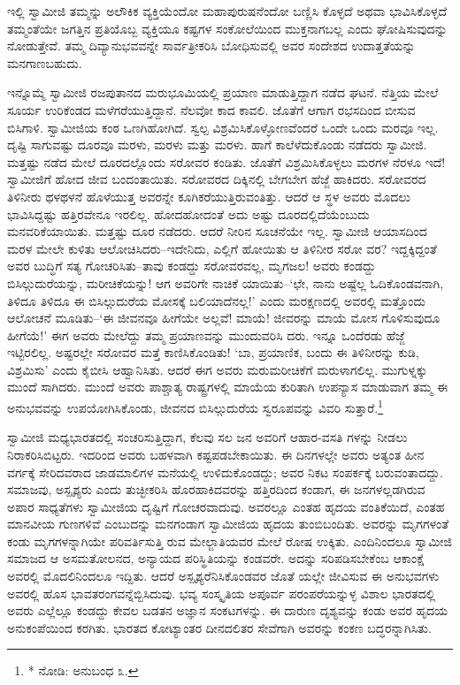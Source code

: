 ಇಲ್ಲಿ ಸ್ವಾಮೀಜಿ ತಮ್ಮನ್ನು ಅಲೌಕಿಕ ವ್ಯಕ್ತಿಯೆಂದೋ ಮಹಾಪುರುಷನೆಂದೋ ಬಣ್ಣಿಸಿ ಕೊಳ್ಳದೆ ಅಥವಾ ಭಾವಿಸಿಕೊಳ್ಳದೆ ತಮ್ಮಂತೆಯೇ ಜಗತ್ತಿನ ಪ್ರತಿಯೊಬ್ಬ ವ್ಯಕ್ತಿಯೂ ಕಷ್ಟಗಳ ಸಂಕೋಲೆಯಿಂದ ಮುಕ್ತನಾಗಬಲ್ಲ ಎಂದು ಘೋಷಿಸುವುದನ್ನು ನೋಡುತ್ತೇವೆ. ತಮ್ಮ ದಿವ್ಯಾನುಭವವನ್ನೇ ಸಾರ್ವತ್ರೀಕರಿಸಿ ಬೋಧಿಸುವಲ್ಲಿ ಅವರ ಸಂದೇಶದ ಉದಾತ್ತತೆಯನ್ನು ಮನಗಾಣಬಹುದು.

ಇನ್ನೊಮ್ಮೆ ಸ್ವಾಮೀಜಿ ರಜಪುತಾನದ ಮರುಭೂಮಿಯಲ್ಲಿ ಪ್ರಯಾಣ ಮಾಡುತ್ತಿದ್ದಾಗ ನಡೆದ ಘಟನೆ. ನೆತ್ತಿಯ ಮೇಲೆ ಸೂರ್ಯ ಉರಿಕೆಂಡದ ಮಳೆಗರೆಯುತ್ತಿದ್ದಾನೆ. ನೆಲವೋ ಕಾದ ಕಾವಲಿ. ಜೊತೆಗೆ ಆಗಾಗ ರಭಸದಿಂದ ಬೀಸುವ ಬಿಸಿಗಾಳಿ. ಸ್ವಾಮೀಜಿಯ ಕಂಠ ಒಣಗಿಹೋಗಿದೆ. ಸ್ವಲ್ಪ ವಿಶ್ರಮಿಸಿಕೊಳ್ಳೋಣವೆಂದರೆ ಒಂದೇ ಒಂದು ಮರವೂ ಇಲ್ಲ. ದೃಷ್ಟಿ ಸಾಗುವಷ್ಟು ದೂರವೂ ಮರಳು, ಮರಳು ಮತ್ತು ಮರಳು. ಹಾಗೆ ಕಾಲೆಳೆದುಕೊಂಡು ನಡೆದರು ಸ್ವಾಮೀಜಿ. ಮತ್ತಷ್ಟು ನಡೆದ ಮೇಲೆ ದೂರದಲ್ಲೊಂದು ಸರೋವರ ಕಂಡಿತು. ಜೊತೆಗೆ ವಿಶ್ರಮಿಸಿಕೊಳ್ಳಲು ಮರಗಳ ನೆರಳೂ ಇದೆ! ಸ್ವಾಮೀಜಿಗೆ ಹೋದ ಜೀವ ಬಂದಂತಾಯಿತು. ಸರೋವರದ ದಿಕ್ಕಿನಲ್ಲಿ ಬೇಗಬೇಗ ಹೆಜ್ಜೆ ಹಾಕಿದರು. ಸರೋವರದ ತಿಳಿನೀರು ಥಳಥಳನೆ ಹೊಳೆಯುತ್ತ ಅವರನ್ನೇ ಕೂಗಿಕರೆಯುತ್ತಿರುವಂತಿತ್ತು. ಆದರೆ ಆ ಸ್ಥಳ ಅವರು ಮೊದಲು ಭಾವಿಸಿದ್ದಷ್ಟು ಹತ್ತಿರವೇನೂ ಇರಲಿಲ್ಲ. ಹೋದಹೋದಂತೆ ಅದು ಅಷ್ಟು ದೂರದಲ್ಲಿದೆಯೆಂಬುದು ಮನವರಿಕೆಯಾಯಿತು. ಮತ್ತಷ್ಟು ದೂರ ನಡೆದರು. ಆದರೆ ನೀರಿನ ಸೂಚನೆಯೇ ಇಲ್ಲ. ಸ್ವಾಮೀಜಿ ಆಯಾಸದಿಂದ ಮರಳ ಮೇಲೇ ಕುಳಿತು ಆಲೋಚಿಸಿದರು–ಇದೇನಿದು, ಎಲ್ಲಿಗೆ ಹೋಯಿತು ಆ ತಿಳಿನೀರ ಸರೋ ವರ? ಇದ್ದಕ್ಕಿದ್ದಂತೆ ಅವರ ಬುದ್ಧಿಗೆ ಸತ್ಯ ಗೋಚರಿಸಿತು–ತಾವು ಕಂಡದ್ದು ಸರೋವರವಲ್ಲ, ಮೃಗಜಲ! ಅವರು ಕಂಡದ್ದು ಬಿಸಿಲ್ಗುದುರೆಯನ್ನು, ಮರೀಚಿಕೆಯನ್ನು! ಆಗ ಅವರಿಗೇ ನಾಚಿಕೆ ಯಾಯಿತು–‘ಛೇ, ನಾನು ಅಷ್ಟೆಲ್ಲ ಓದಿಕೊಂಡವನಾಗಿ, ತಿಳಿದೂ ತಿಳಿದೂ ಈ ಬಿಸಿಲ್ಗುದುರೆಯ ಮೋಸಕ್ಕೆ ಬಲಿಯಾದೆನಲ್ಲ!’ ಎಂದು ಮರಕ್ಷಣದಲ್ಲಿ ಅವರಲ್ಲಿ ಮತ್ತೊಂದು ಆಲೋಚನೆ ಮೂಡಿತು–‘ಈ ಜೀವನವೂ ಹೀಗೆಯೇ ಅಲ್ಲವೆ! ಮಾಯೆ! ಜೀವರನ್ನು ಮಾಯೆ ಮೋಸ ಗೊಳಿಸುವುದೂ ಹೀಗೆಯೆ!’ ಈಗ ಅವರು ಮೇಲೆದ್ದು ತಮ್ಮ ಪ್ರಯಾಣವನ್ನು ಮುಂದುವರಿಸಿ ದರು. ಇನ್ನೂ ಒಂದೆರಡು ಹೆಜ್ಜೆ ಇಟ್ಟಿರಲಿಲ್ಲ. ಅಷ್ಟರಲ್ಲೇ ಸರೋವರ ಮತ್ತೆ ಕಾಣಿಸಿಕೊಂಡಿತು! ‘ಬಾ, ಪ್ರಯಾಣಿಕ, ಬಂದು ಈ ತಿಳಿನೀರನ್ನು ಕುಡಿ, ವಿಶ್ರಮಿಸು’ ಎಂದು ಕೈಬೀಸಿ ಆಹ್ವಾನಿಸಿತು. ಆದರೆ ಈಗ ಅವರು ಮರುಮರೀಚಿಕೆಗೆ ಮರುಳಾಗಲಿಲ್ಲ. ಮುಗುಳ್ನಕ್ಕು ಮುಂದೆ ಸಾಗಿದರು. ಮುಂದೆ ಅವರು ಪಾಶ್ಚಾತ್ಯ ರಾಷ್ಟ್ರಗಳಲ್ಲಿ ಮಾಯೆಯ ಕುರಿತಾಗಿ ಉಪನ್ಯಾಸ ಮಾಡುವಾಗ ತಮ್ಮ ಈ ಅನುಭವವನ್ನು ಉಪಯೋಗಿಸಿಕೊಂಡು, ಜೀವನದ ಬಿಸಿಲ್ಗುದುರೆಯ ಸ್ವರೂಪವನ್ನು ವಿವರಿ ಸುತ್ತಾರೆ.\footnote{* ನೋಡಿ: ಅನುಬಂಧ ೩.}

ಸ್ವಾಮೀಜಿ ಮಧ್ಯಭಾರತದಲ್ಲಿ ಸಂಚರಿಸುತ್ತಿದ್ದಾಗ, ಕೆಲವು ಸಲ ಜನ ಅವರಿಗೆ ಆಹಾರ-ವಸತಿ ಗಳನ್ನು ನೀಡಲು ನಿರಾಕರಿಸಿಬಿಟ್ಟರು. ಇದರಿಂದ ಅವರು ಬಹಳವಾಗಿ ಕಷ್ಟಪಡಬೇಕಾಯಿತು. ಈ ದಿನಗಳಲ್ಲೇ ಅವರು ಅತ್ಯಂತ ಹೀನ ವರ್ಗಕ್ಕೆ ಸೇರಿದವರಾದ ಜಾಡಮಾಲಿಗಳ ಮನೆಯಲ್ಲಿ ಉಳಿದುಕೊಂಡದ್ದು; ಅವರ ನಿಕಟ ಸಂಪರ್ಕಕ್ಕೆ ಬರುವಂತಾದದ್ದು. ಸಮಾಜವು, ಅಸ್ಪೃಶ್ಯರು ಎಂದು ತುಚ್ಛೀಕರಿಸಿ ಹೊರಹಾಕಿದವರನ್ನು ಹತ್ತಿರದಿಂದ ಕಂಡಾಗ, ಈ ಜನಗಳಲ್ಲಡಗಿರುವ ಅಪಾರ ಸಾಧ್ಯತೆಗಳು ಸ್ವಾಮೀಜಿಯ ದೃಷ್ಟಿಗೆ ಗೋಚರವಾದುವು. ಅವರಲ್ಲೂ ಎಂತಹ ಹೃದಯ ವಂತಿಕೆಯಿದೆ, ಎಂತಹ ಮಾನವೀಯ ಗುಣಗಳಿವೆ ಎಂಬುದನ್ನು ಮನಗಂಡಾಗ ಸ್ವಾಮೀಜಿಯ ಹೃದಯ ತುಂಬಿಬಂದಿತು. ಅವರನ್ನು ಮೃಗಗಳಂತೆ ಕಂಡು ಮೃಗಗಳನ್ನಾಗಿಯೇ ಪರಿವರ್ತಿಸುತ್ತಿ ರುವ ಮೇಲ್ಜಾತಿಯವರ ಮೇಲೆ ರೋಷ ಉಕ್ಕಿತು. ಎಂದಿನಿಂದಲೂ ಸ್ವಾಮೀಜಿ ಸಮಾಜದ ಆ ಅಸಮತೋಲನದ, ಅನ್ಯಾಯದ ಪರಿಸ್ಥಿತಿಯನ್ನು ಕಂಡವರೇ. ಅದನ್ನು ಸರಿಪಡಿಸಬೇಕೆಂಬ ಆಕಾಂಕ್ಷೆ ಅವರಲ್ಲಿ ಮೊದಲಿನಿಂದಲೂ ಇದ್ದಿತು. ಆದರೆ ಅಸ್ಪೃಶ್ಯರೆನಿಸಿಕೊಂಡವರ ಜೊತೆ ಯಲ್ಲೇ ಜೀವಿಸುವ ಈ ಅನುಭವಗಳು ಅವರಲ್ಲಿ ಹೊಸ ಭಾವತರಂಗವನ್ನೆಬ್ಬಿಸಿದುವು. ಭವ್ಯ ಸಂಸ್ಕೃತಿಯ ಅಪೂರ್ವ ಪರಂಪರೆಯನ್ನುಳ್ಳ ವಿಶಾಲ ಭಾರತದಲ್ಲಿ ಅವರು ಎಲ್ಲೆಲ್ಲೂ ಕಂಡದ್ದು ಕೇವಲ ಬಡತನ ಅಜ್ಞಾನ ಸಂಕಟಗಳನ್ನು. ಈ ದಾರುಣ ದೃಶ್ಯವನ್ನು ಕಂಡು ಅವರ ಹೃದಯ ಅನುಕಂಪೆಯಿಂದ ಕರಗಿತು. ಭಾರತದ ಕೋಟ್ಯಾಂತರ ದೀನದಲಿತರ ಸೇವೆಗಾಗಿ ಅವರನ್ನು ಕಂಕಣ ಬದ್ಧರನ್ನಾಗಿಸಿತು.

